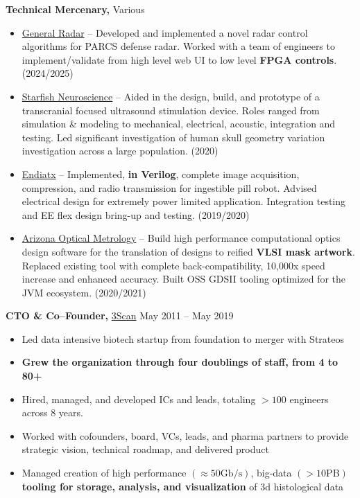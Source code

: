 \documentclass{res}
\begin{document}
\begin{resume}
{\bf Technical Mercenary,} Various \hfill
\begin{itemize}  \itemsep -2pt
  \item \href{https://www.genrad.com/}{General Radar} -- Developed and implemented a novel radar control algorithms
        for PARCS defense radar. Worked with a team of engineers to implement/validate from high
        level web UI to low level \textbf{FPGA controls}. (2024/2025)
  \item \href{https://starfishneuroscience.com/}{Starfish Neuroscience} -- Aided in the design, build, and prototype of a transcranial
        focused ultrasound stimulation device. Roles ranged from simulation \& modeling to
        mechanical, electrical, acoustic, integration and testing. Led significant investigation
        of human skull geometry variation investigation across a large population. (2020)
  \item \href{https://endiatx.com/}{Endiatx} -- Implemented, \textbf{in Verilog}, complete image acquisition, compression, and radio
        transmission for ingestible pill robot. Advised electrical design for extremely power limited application.
        Integration testing and EE flex design bring-up and testing. (2019/2020)
  \item \href{https://aom.us/}{Arizona Optical Metrology} -- Build high performance computational optics design software
        for the translation of designs to reified \textbf{VLSI mask artwork}.
        Replaced existing tool with complete back-compatibility, 10,000x speed increase and enhanced accuracy.
        Built OSS GDSII tooling optimized for the JVM ecosystem. (2020/2021)
\end{itemize}

{\bf CTO \& Co--Founder,} \href{http://www.3scan.com}{3Scan} \hfill
May 2011 -- May 2019
\begin{itemize}  \itemsep -2pt
  \item Led data intensive biotech startup from foundation to merger with Strateos
  \item \textbf{Grew the organization through four doublings of staff, from 4 to 80+}
  \item Hired, managed, and developed ICs and leads, totaling $> 100$ engineers across 8 years.
  \item Worked with cofounders, board, VCs, leads, and pharma partners to provide strategic vision,
    technical roadmap, and delivered product
  \item Managed creation of high performance $(\approx 50 \mathrm{Gb/s})$, big-data $(> 10\mathrm{PB})$ \textbf{tooling for
    storage, analysis, and visualization} of 3d histological data
\end{itemize}


\end{resume}
\end{document}
